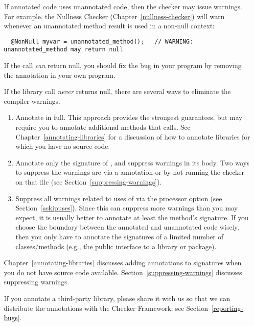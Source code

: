 If annotated code uses unannotated code, then the checker may issue
warnings.  For example, the Nullness Checker (Chapter~\ref{nullness-checker}) will
warn whenever an unannotated method result is used in a non-null context:

\begin{Verbatim}
  @NonNull myvar = unannotated_method();   // WARNING: unannotated_method may return null
\end{Verbatim}

If the call \emph{can} return null, you should fix the bug in your program by
removing the  annotation in your own program.

If the library call \emph{never} returns null,
there are several ways to eliminate the compiler warnings.
\begin{enumerate}
\item Annotate  in full.  This approach provides
  the strongest guarantees, but may require you to annotate additional
  methods that  calls.  See
  Chapter~\ref{annotating-libraries} for a discussion of how to annotate
  libraries for which you have no source code.
\item Annotate only the signature of , and
  suppress warnings in its body.  Two ways to suppress the warnings are via a
   annotation or by not running the checker on that
  file (see Section~\ref{suppressing-warnings}).
\item Suppress all warnings related to uses of 
  via the  processor option
  (see Section~\ref{askipuses}).
  Since this can suppress more warnings than you may expect,
  it is usually better to annotate at least the method's signature.  If you
  choose the boundary between the annotated and unannotated code wisely,
  then you only have to annotate the signatures of a limited number of
  classes/methods
  (e.g., the public interface to a library or package).

\end{enumerate}

Chapter~\ref{annotating-libraries} discusses adding annotations to
signatures when you do not have source code available.
Section~\ref{suppressing-warnings} discusses suppressing warnings.


If you annotate a third-party library, please share it with us so that we
can distribute the annotations with the Checker Framework; see
Section~\ref{reporting-bugs}.


